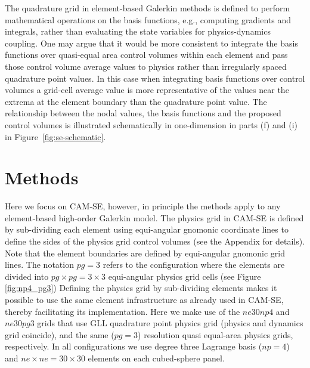 \documentclass[twocol]{ametsoc}
\begin{document}
The quadrature grid in element-based Galerkin methods is defined to perform mathematical operations on the basis functions, e.g., computing gradients and integrals, rather than evaluating the state variables for physics-dynamics coupling. One may argue that it would be more consistent to integrate the basis functions over quasi-equal area control volumes within each element and pass those control volume average values to physics rather than irregularly spaced quadrature point values. In this case when integrating basis functions over control volumes a grid-cell average value is more representative of the values near the extrema at the element boundary than the quadrature point value. The relationship between the nodal values, the basis functions and the proposed control volumes is illustrated schematically in one-dimension in parts (f) and (i) in Figure~\ref{fig:se-schematic}. 

\section{Methods}\label{sec:methods}
Here we focus on CAM-SE, however, in principle the methods apply to any element-based high-order Galerkin model. The physics grid in CAM-SE is defined by sub-dividing each element using equi-angular gnomonic coordinate lines to define the sides of the physics grid control volumes (see the Appendix for details). Note that the element boundaries are defined by equi-angular gnomonic grid lines. The notation $pg=3$ refers to the configuration where the elements are divided into $pg\times pg=3\times 3$ equi-angular physics grid cells (see Figure \ref{fig:np4_pg3}) {\color{red}{resulting in a quasi-equal spherical area grid resembling the cubed-sphere.}} Defining the physics grid by sub-dividing elements makes it possible to use the same element infrastructure as already used in CAM-SE, thereby facilitating its implementation. Here we make use of the $ne30np4$ and $ne30pg3$ grids that use GLL quadrature point physics grid (physics and dynamics grid coincide), and the same ($pg=3$) resolution quasi equal-area physics grids, respectively. In all configurations we use degree three Lagrange basis ($np=4$) and $ne\times ne=30\times 30$ elements on each cubed-sphere panel.
\end{document}
